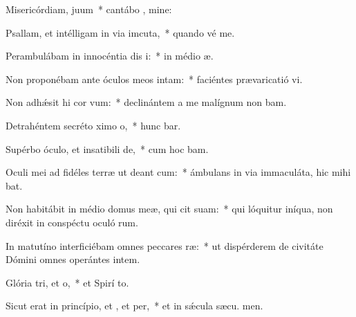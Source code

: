 \item Misericórdiam,  juum~* cantábo , mine:
\item Psallam, et intélligam in via imcuta,~* quando vé  me.
\item Perambulábam in innocéntia dis i:~* in médio  æ.
\item Non proponébam ante óculos meos  intam:~* faciéntes prævaricatió vi.
\item Non adhǽsit hi cor vum:~* declinántem a me malígnum non bam.
\item Detrahéntem secréto ximo o,~* hunc bar.
\item Supérbo óculo, et insatibili de,~* cum hoc  bam.
\item Oculi mei ad fidéles terræ ut deant cum:~* ámbulans in via immaculáta, hic mihi bat.
\item Non habitábit in médio domus meæ, qui cit suam:~* qui lóquitur iníqua, non diréxit in conspéctu oculó rum.
\item In matutíno interficiébam omnes peccares ræ:~* ut dispérderem de civitáte Dómini omnes operántes intem.
\item Glória tri, et o,~* et Spirí to.
\item Sicut erat in princípio, et , et per,~* et in sǽcula sæcu. men.
